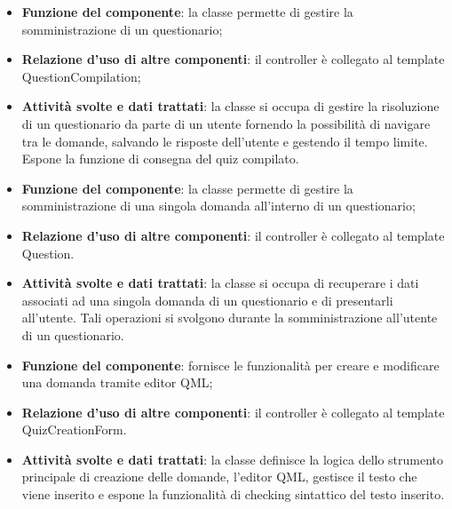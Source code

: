 
\begin{itemize}
	\item\textbf{Funzione del componente}: la classe permette di gestire la somministrazione di un questionario;
	\item\textbf{Relazione d'uso di altre componenti}: il controller è collegato al template QuestionCompilation;
	\item\textbf{Attività svolte e dati trattati}: la classe si occupa di gestire la risoluzione di un questionario da parte di un utente fornendo la possibilità di navigare tra le domande, salvando le risposte dell'utente e gestendo il tempo limite. Espone la funzione di consegna del quiz compilato.
\end{itemize}


\begin{itemize}
	\item\textbf{Funzione del componente}: la classe permette di gestire la somministrazione di una singola domanda all'interno di un questionario;
	\item\textbf{Relazione d'uso di altre componenti}: il controller è collegato al template Question.
	\item\textbf{Attività svolte e dati trattati}: la classe si occupa di recuperare i dati associati ad una singola domanda di un questionario e di presentarli all'utente. Tali operazioni si svolgono durante la somministrazione all'utente di un questionario.
\end{itemize}


\begin{itemize}
	\item\textbf{Funzione del componente}: fornisce le funzionalità per creare e modificare una domanda tramite editor QML;
	\item\textbf{Relazione d'uso di altre componenti}: il controller è collegato al template QuizCreationForm.
	\item\textbf{Attività svolte e dati trattati}: la classe definisce la logica dello strumento principale di creazione delle domande, l'editor QML, gestisce il testo che viene inserito e espone la funzionalità di checking sintattico del testo inserito.
\end{itemize}


